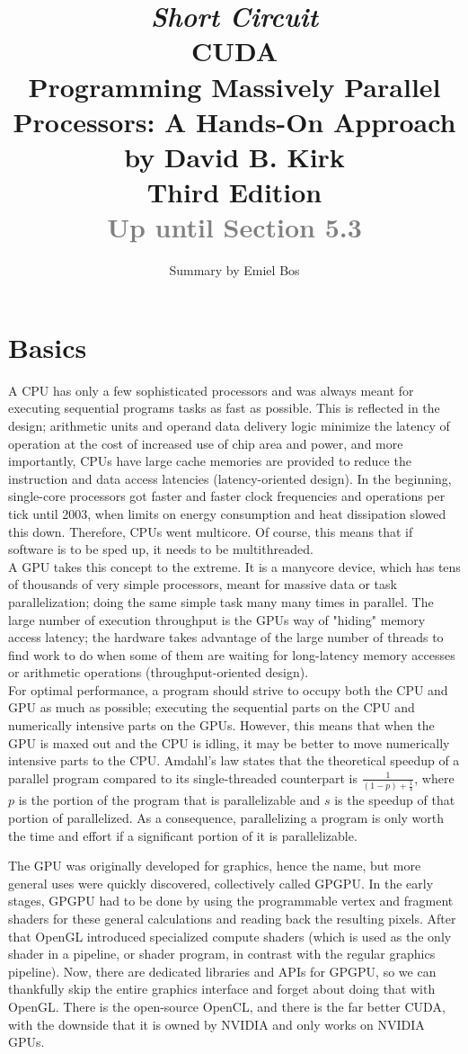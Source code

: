 \documentclass[table, xcdraw]{article}%
\title{
\textit{Short Circuit}\\
\vspace{20px}
\huge
CUDA\\
\vspace{25px}
\large
Programming Massively Parallel Processors: A Hands-On Approach\\
by David B. Kirk\\
Third Edition\\
\textcolor{gray}{Up until Section 5.3}
}
\author{Summary by Emiel Bos}
\date{}
\begin{document}
\maketitle

\section{Basics}

A CPU has only a few sophisticated processors and was always meant for executing sequential programs tasks as fast as possible. This is reflected in the design; arithmetic units and operand data delivery logic minimize the latency of operation at the cost of increased use of chip area and power, and more importantly, CPUs have large cache memories are provided to reduce the instruction and data access latencies (latency-oriented design). In the beginning, single-core processors got faster and faster clock frequencies and operations per tick until 2003, when limits on energy consumption and heat dissipation slowed this down. Therefore, CPUs went multicore. Of course, this means that if software is to be sped up, it needs to be multithreaded.\\
A GPU takes this concept to the extreme. It is a manycore device, which has tens of thousands of very simple processors, meant for massive data or task parallelization; doing the same simple task many many times in parallel. The large number of execution throughput is the GPUs way of "hiding" memory access latency; the hardware takes advantage of the large number of threads to find work to do when some of them are waiting for long-latency memory accesses or arithmetic operations (throughput-oriented design).\\
For optimal performance, a program should strive to occupy both the CPU and GPU as much as possible; executing the sequential parts on the CPU and numerically intensive parts on the GPUs. However, this means that when the GPU is maxed out and the CPU is idling, it may be better to move numerically intensive parts to the CPU. Amdahl's law states that the theoretical speedup of a parallel program compared to its single-threaded counterpart is $\frac{1}{(1-p) + \frac{1}{s}}$, where $p$ is the portion of the program that is parallelizable and $s$ is the speedup of that portion of parallelized. As a consequence, parallelizing a program is only worth the time and effort if a significant portion of it is parallelizable.

The GPU was originally developed for graphics, hence the name, but more general uses were quickly discovered, collectively called GPGPU. In the early stages, GPGPU had to be done by using the programmable vertex and fragment shaders for these general calculations and reading back the resulting pixels. After that OpenGL introduced specialized compute shaders (which is used as the only shader in a pipeline, or shader program, in contrast with the regular graphics pipeline). Now, there are dedicated libraries and APIs for GPGPU, so we can thankfully skip the entire graphics interface and forget about doing that with OpenGL. There is the open-source OpenCL, and there is the far better CUDA, with the downside that it is owned by NVIDIA and only works on NVIDIA GPUs.
\end{document}
